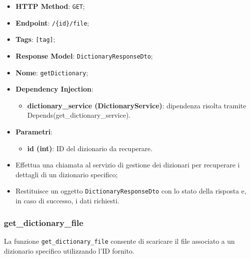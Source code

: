 \begin{itemize}
  \item \textbf{HTTP Method}: \texttt{GET};
  \item \textbf{Endpoint}: \texttt{/\{id\}/file};
  \item \textbf{Tags}: \texttt{[tag]};
  \item \textbf{Response Model}: \texttt{DictionaryResponseDto};
  \item \textbf{Nome}: \texttt{getDictionary};
  \item \textbf{Dependency Injection}:
  \begin{itemize}
    \item \textbf{dictionary\_service (DictionaryService)}: dipendenza risolta tramite Depends(get\_dictionary\_service).
  \end{itemize}
  \item \textbf{Parametri}:
  \begin{itemize}
    \item \textbf{id (int)}: ID del dizionario da recuperare.
  \end{itemize}
\end{itemize}

\begin{itemize}
  \item Effettua una chiamata al servizio di gestione dei dizionari per recuperare i dettagli di un dizionario specifico;
  \item Restituisce un oggetto \texttt{DictionaryResponseDto} con lo stato della risposta e, in caso di successo, i dati richiesti.
\end{itemize}

\subsubsection{get\_dictionary\_file}

\par La funzione \texttt{get\_dictionary\_file} consente di scaricare il file associato a un dizionario specifico utilizzando l'ID fornito.

